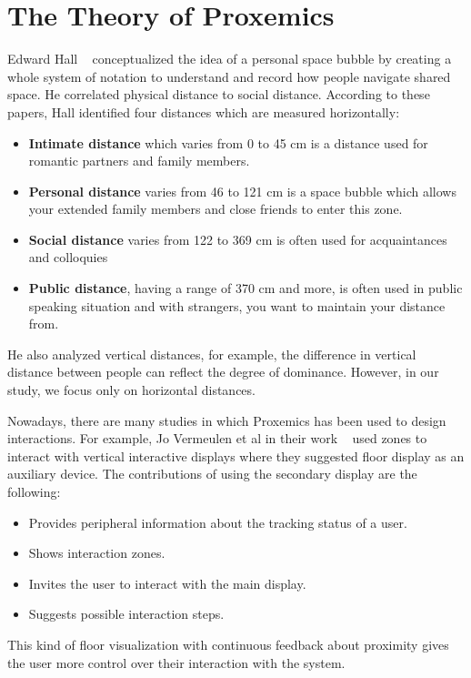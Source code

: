\section{The Theory of Proxemics}
\label{sec:The Theory of Proxemics}
Edward Hall ~\cite{hall1966hidden,hall1963system} conceptualized the idea of a
personal space bubble by creating a whole system of notation to understand
and record how people navigate shared space.
He correlated physical distance to social distance.
According to these papers, Hall identified four distances which are measured horizontally:
\begin{itemize}
  \item \textbf{Intimate distance} which varies from 0 to 45 cm is a distance used for romantic partners and family members.
  \item \textbf{Personal distance} varies from 46 to 121 cm is a space bubble which allows your extended family
        members and close friends to enter this zone.
  \item \textbf{Social distance} varies from 122 to 369 cm is often used for acquaintances and colloquies
  \item \textbf{Public distance}, having a range of 370 cm and more, is often used in public speaking
        situation and with strangers, you want to maintain your distance from.
\end{itemize}

He also analyzed vertical distances, for example, the difference in vertical distance
between people can reflect the degree of dominance.
However, in our study, we focus only on horizontal distances.

Nowadays, there are many studies in which Proxemics has been used to design interactions.
For example, Jo Vermeulen et al in their work ~\cite{vermeulen2015proxemic} used zones to
interact with vertical interactive displays where they suggested floor display as an auxiliary device.
The contributions of using the secondary display are the following:
\begin{itemize}
    \item Provides peripheral information about the tracking status of a user.
    \item Shows interaction zones.
    \item Invites the user to interact with the main display.
    \item Suggests possible interaction steps.
\end{itemize}
This kind of floor visualization with continuous feedback about proximity gives the user
more control over their interaction with the system.

